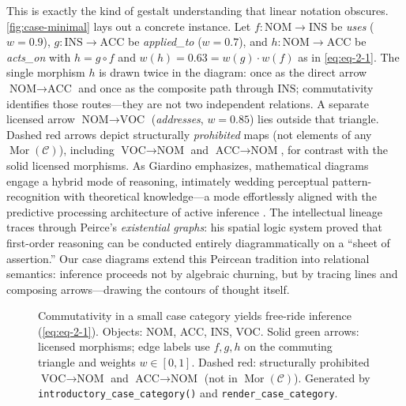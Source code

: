 \documentclass[
]{article}
\makeatletter
\newcommand*\pandocbounded[1]{%
  \sbox\pandoc@box{#1}%
  \Gscale@div\@tempa{\textheight}{\dimexpr\ht\pandoc@box+\dp\pandoc@box\relax}%
  \Gscale@div\@tempb{\linewidth}{\wd\pandoc@box}%
  \ifdim\@tempb\p@<\@tempa\p@\let\@tempa\@tempb\fi%
  \ifdim\@tempa\p@<\p@\scalebox{\@tempa}{\usebox\pandoc@box}%
  \else\usebox{\pandoc@box}%
  \fi%
}
\makeatother
\begin{document}
This is exactly the kind of gestalt understanding that linear notation
obscures. \autoref{fig:case-minimal} lays out a concrete instance. Let
\(f\colon\text{NOM}\to\text{INS}\) be \emph{uses} (\(w=0.9\)),
\(g\colon\text{INS}\to\text{ACC}\) be \emph{applied\_to} (\(w=0.7\)),
and \(h\colon\text{NOM}\to\text{ACC}\) be \emph{acts\_on} with
\(h=g\circ f\) and \(w(h)=0.63=w(g)\cdot w(f)\) as in
\autoref{eq:eq-2-1}. The single morphism \(h\) is drawn twice in the
diagram: once as the direct arrow \(\text{NOM}\to\text{ACC}\) and once
as the composite path through \(\text{INS}\); commutativity identifies
those routes---they are not two independent relations. A separate
licensed arrow \(\text{NOM}\to\text{VOC}\) (\emph{addresses},
\(w=0.85\)) lies outside that triangle. Dashed red arrows depict
structurally \emph{prohibited} maps (not elements of any
\(\operatorname{Mor}(\mathcal{C})\)), including
\(\text{VOC}\to\text{NOM}\) and \(\text{ACC}\to\text{NOM}\), for
contrast with the solid licensed morphisms. As Giardino
\citeyearpar{giardino2017diagrammatic} emphasizes, mathematical diagrams
engage a hybrid mode of reasoning, intimately wedding perceptual
pattern-recognition with theoretical knowledge---a mode effortlessly
aligned with the predictive processing architecture of active inference
\citep{namjoshi2026fundamentals}. The intellectual lineage traces
through Peirce's \emph{existential graphs}: his spatial logic system
proved that first-order reasoning can be conducted entirely
diagrammatically on a ``sheet of assertion.'' Our case diagrams extend
this Peircean tradition into relational semantics: inference proceeds
not by algebraic churning, but by tracing lines and composing
arrows---drawing the contours of thought itself.

\begin{figure}
\centering
\pandocbounded{\includegraphics[keepaspectratio,alt={Commutativity in a small case category yields free-ride inference (). Objects: NOM, ACC, INS, VOC. Solid green arrows: licensed morphisms; edge labels use f,g,h on the commuting triangle and weights w\textbackslash in{[}0,1{]}. Dashed red: structurally prohibited \textbackslash text\{VOC\}\textbackslash to\textbackslash text\{NOM\} and \textbackslash text\{ACC\}\textbackslash to\textbackslash text\{NOM\} (not in \textbackslash operatorname\{Mor\}(\textbackslash mathcal\{C\})). Generated by introductory\_case\_category() and render\_case\_category.}]{../figures/case_category_minimal.png}}
\caption{Commutativity in a small case category yields free-ride
inference (\autoref{eq:eq-2-1}). Objects: NOM, ACC, INS, VOC. Solid
green arrows: licensed morphisms; edge labels use \(f,g,h\) on the
commuting triangle and weights \(w\in[0,1]\). Dashed red: structurally
prohibited \(\text{VOC}\to\text{NOM}\) and \(\text{ACC}\to\text{NOM}\)
(not in \(\operatorname{Mor}(\mathcal{C})\)). Generated by
\protect\texttt{introductory\_case\_category()} and
\protect\texttt{render\_case\_category}.}\label{fig:case-minimal}
\end{figure}
\end{document}
